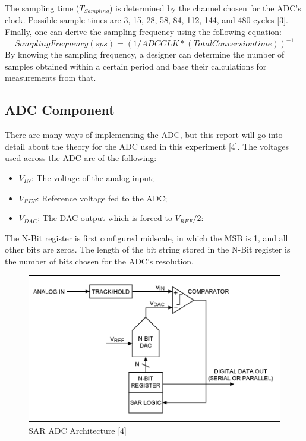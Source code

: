 \documentclass[12pt]{report}
\begin{document}
The sampling time (\(T_{Sampling}\)) is determined by the channel chosen for the ADC's clock. Possible sample times are 3, 15, 28, 58, 84, 112, 144, and 480 cycles [3].\\
Finally, one can derive the sampling frequency using the following equation:
\[ Sampling Frequency (sps) = (1/ADCCLK * (Total Conversion time))^{-1} \]
By knowing the sampling frequency, a designer can determine the number of samples obtained within a certain period and base their calculations for measurements from that.\\
\subsection{ADC Component}
There are many ways of implementing the ADC, but this report will go into detail about the theory for the ADC used in this experiment [4]. The voltages used across the ADC are of the following:\\
\begin{itemize}
	\item \(V_{IN}\): The voltage of the analog input;
	\item \(V_{REF}\): Reference voltage fed to the ADC; 
	\item \(V_{DAC}\): The DAC output which is forced to \(V_{REF}/2\):
\end{itemize}
The N-Bit register is first configured midscale, in which the MSB is 1, and all other bits are zeros. The length of the bit string stored in the N-Bit register is the number of bits chosen for the ADC's resolution.\\
\begin{figure}\label{adc}
	\begin{center}
		\includegraphics{adc.png}
		\caption{SAR ADC Architecture [4]}
	\end{center}
\end{figure}
\end{document}
